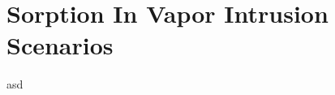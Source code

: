 \begin{comment}
Almost forgot about this.

Main point to make is that there is a lack of knowledge regarding the effects of sorption in VI.
Not many studies have been done, but the few that have been done make the case that sorption may have a significant effect - and may especially be significant in CPM and mitigation scenarios.

\end{comment}


\section{Sorption In Vapor Intrusion Scenarios}
asd
